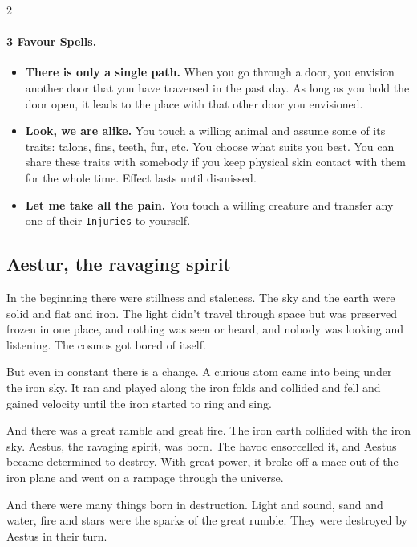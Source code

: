\documentclass{osr-template/zine}
\begin{document}
\begin{multicols*}{2}
\paragraph{3 Favour Spells.}

\begin{itemize}[nosep]
    \item[\ding{108}] \textbf{There is only a single path.} When you go through a door, you envision another door that you have traversed in the past day. As long as you hold the door open, it leads to the place with that other door you envisioned.
    \item[\ding{108}] \textbf{Look, we are alike.} You touch a willing animal and assume some of its traits: talons, fins, teeth, fur, etc. You choose what suits you best.
 You can share these traits with somebody if you keep physical skin contact with them for the whole time.
 Effect lasts until dismissed.
    \item[\ding{108}] \textbf{Let me take all the pain.} You touch a willing creature and transfer any one of their \texttt{Injuries} to yourself.
\end{itemize}

\newpage

\subsection*{Aestur, the ravaging spirit}

In the beginning there were stillness and staleness. The sky and the earth were solid and flat and iron. The light didn't travel through space but was preserved frozen in one place, and nothing was seen or heard, and nobody was looking and listening. The cosmos got bored of itself.

But even in constant there is a change. A curious atom came into being under the iron sky. It ran and played along the iron folds and collided and fell and gained velocity until the iron started to ring and sing.

And there was a great ramble and great fire. The iron earth collided with the iron sky. Aestus, the ravaging spirit, was born. The havoc ensorcelled it, and Aestus became determined to destroy. With great power, it broke off a mace out of the iron plane and went on a rampage through the universe.

And there were many things born in destruction. Light and sound, sand and water, fire and stars were the sparks of the great rumble. They were destroyed by Aestus in their turn.


\end{multicols*}
\end{document}
